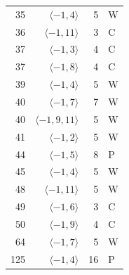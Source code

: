 \begin{longtable}{rrrl}
35 & $\langle -1, 4\rangle$ & 5 & W \\
36 & $\langle -1, 11\rangle$ & 3 & C \\
37 & $\langle -1, 3\rangle$ & 4 & C \\
37 & $\langle -1, 8\rangle$ & 4 & C \\
39 & $\langle -1, 4\rangle$ & 5 & W \\
40 & $\langle -1, 7\rangle$ & 7 & W \\
40 & $\langle -1, 9, 11\rangle$ & 5 & W \\
41 & $\langle -1, 2\rangle$ & 5 & W \\
44 & $\langle -1, 5\rangle$ & 8 & P \\
45 & $\langle -1, 4\rangle$ & 5 & W \\
48 & $\langle -1, 11\rangle$ & 5 & W \\
49 & $\langle -1, 6\rangle$ & 3 & C \\
50 & $\langle -1, 9\rangle$ & 4 & C \\
64 & $\langle -1, 7\rangle$ & 5 & W \\
125 & $\langle -1, 4\rangle$ & 16 & P \\
\bottomrule
\end{longtable}
